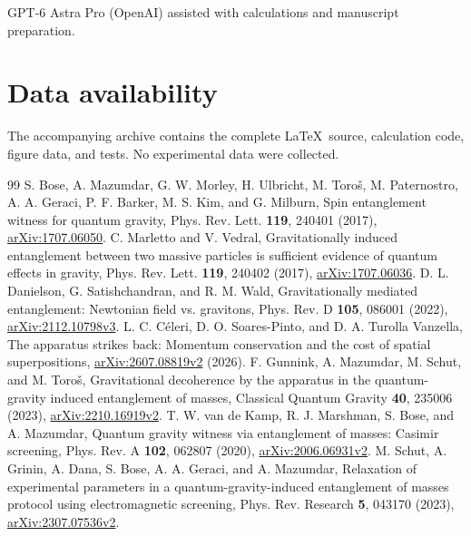 \documentclass[aps,pra,reprint,amsmath,amssymb,longbibliography,floatfix]{revtex4-2}
\begin{document}
\begin{acknowledgments}
GPT-6 Astra Pro (OpenAI) assisted with calculations and manuscript preparation.
\end{acknowledgments}
\section*{Data availability}
The accompanying archive contains the complete \LaTeX\ source, calculation code, figure data, and tests. No experimental data were collected.

\appendix


\begin{thebibliography}{99}
 S. Bose, A. Mazumdar, G. W. Morley, H. Ulbricht, M. Toro\v{s}, M. Paternostro, A. A. Geraci, P. F. Barker, M. S. Kim, and G. Milburn, Spin entanglement witness for quantum gravity, Phys. Rev. Lett. \textbf{119}, 240401 (2017), \href{https://arxiv.org/abs/1707.06050}{arXiv:1707.06050}.
 C. Marletto and V. Vedral, Gravitationally induced entanglement between two massive particles is sufficient evidence of quantum effects in gravity, Phys. Rev. Lett. \textbf{119}, 240402 (2017), \href{https://arxiv.org/abs/1707.06036}{arXiv:1707.06036}.
 D. L. Danielson, G. Satishchandran, and R. M. Wald, Gravitationally mediated entanglement: Newtonian field vs. gravitons, Phys. Rev. D \textbf{105}, 086001 (2022), \href{https://arxiv.org/abs/2112.10798v3}{arXiv:2112.10798v3}.
 L. C. C\'eleri, D. O. Soares-Pinto, and D. A. Turolla Vanzella, The apparatus strikes back: Momentum conservation and the cost of spatial superpositions, \href{https://arxiv.org/abs/2607.08819v2}{arXiv:2607.08819v2} (2026).
 F. Gunnink, A. Mazumdar, M. Schut, and M. Toro\v{s}, Gravitational decoherence by the apparatus in the quantum-gravity induced entanglement of masses, Classical Quantum Gravity \textbf{40}, 235006 (2023), \href{https://arxiv.org/abs/2210.16919v2}{arXiv:2210.16919v2}.
 T. W. van de Kamp, R. J. Marshman, S. Bose, and A. Mazumdar, Quantum gravity witness via entanglement of masses: Casimir screening, Phys. Rev. A \textbf{102}, 062807 (2020), \href{https://arxiv.org/abs/2006.06931v2}{arXiv:2006.06931v2}.
 M. Schut, A. Grinin, A. Dana, S. Bose, A. A. Geraci, and A. Mazumdar, Relaxation of experimental parameters in a quantum-gravity-induced entanglement of masses protocol using electromagnetic screening, Phys. Rev. Research \textbf{5}, 043170 (2023), \href{https://arxiv.org/abs/2307.07536v2}{arXiv:2307.07536v2}.

\end{thebibliography}
\end{document}

